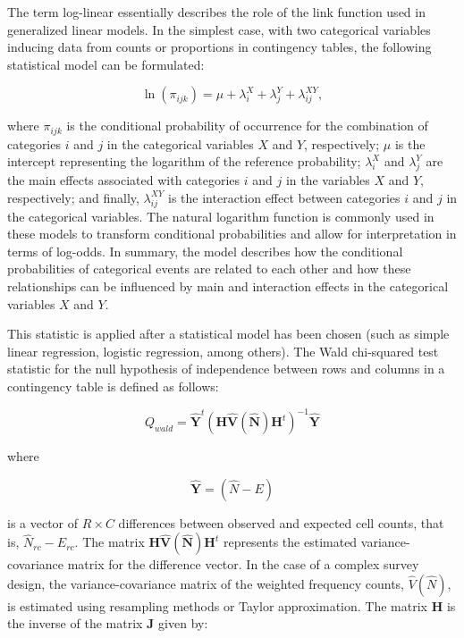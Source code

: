 \documentclass[
  12pt,
]{book}
\begin{document}
The term log-linear essentially describes the role of the link function used in generalized linear models. In the simplest case, with two categorical variables inducing data from counts or proportions in contingency tables, the following statistical model can be formulated:

\[
\ln(\pi_{ijk}) = \mu + \lambda_i^X + \lambda_j^Y + \lambda_{ij}^{XY},   
\]

where \(\pi_{ijk}\) is the conditional probability of occurrence for the combination of categories \(i\) and \(j\) in the categorical variables \(X\) and \(Y\), respectively; \(\mu\) is the intercept representing the logarithm of the reference probability; \(\lambda_i^X\) and \(\lambda_j^Y\) are the main effects associated with categories \(i\) and \(j\) in the variables \(X\) and \(Y\), respectively; and finally, \(\lambda_{ij}^{XY}\) is the interaction effect between categories \(i\) and \(j\) in the categorical variables. The natural logarithm function is commonly used in these models to transform conditional probabilities and allow for interpretation in terms of log-odds. In summary, the model describes how the conditional probabilities of categorical events are related to each other and how these relationships can be influenced by main and interaction effects in the categorical variables \(X\) and \(Y\).

This statistic is applied after a statistical model has been chosen (such as simple linear regression, logistic regression, among others). The Wald chi-squared test statistic for the null hypothesis of independence between rows and columns in a contingency table is defined as follows:

\[
Q_{wald} = \hat{\boldsymbol{Y}}^{t} \left(\boldsymbol{H} \hat{\boldsymbol{V}} \left(\hat{\boldsymbol{N}}\right) \boldsymbol{H}^{t}\right)^{-1} \hat{\boldsymbol{Y}}
\]

where

\[
\hat{\boldsymbol{Y}} = \left(\hat{N} - E\right)
\]

is a vector of \(R \times C\) differences between observed and expected cell counts, that is, \(\hat{N}_{rc} - E_{rc}\). The matrix \(\boldsymbol{H} \hat{\boldsymbol{V}} \left(\hat{\boldsymbol{N}}\right) \boldsymbol{H}^{t}\) represents the estimated variance-covariance matrix for the difference vector. In the case of a complex survey design, the variance-covariance matrix of the weighted frequency counts, \(\hat{V} \left(\hat{N}\right)\), is estimated using resampling methods or Taylor approximation. The matrix \(\boldsymbol{H}\) is the inverse of the matrix \(\boldsymbol{J}\) given by:
\end{document}
